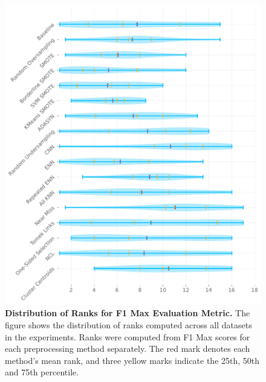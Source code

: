 \begin{figure}
    \centering
    \includegraphics[width=\linewidth]{figures/f1_max_ranks_distribution.pdf}
    \caption{
        \textbf{Distribution of Ranks for F1 Max Evaluation Metric.} The figure shows the
        distribution of ranks computed across all datasets in the experiments. Ranks were computed
        from F1 Max scores for each preprocessing method separately. The red mark denotes each
        method’s mean rank, and three yellow marks indicate the 25th, 50th and 75th percentile.
    }
    \label{figure:f1_max_rank_distributions}
\end{figure}

